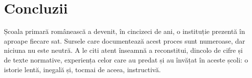 \documentclass{texign-article}
\begin{document}
\section{Concluzii}

Școala primară românească a devenit, în cincizeci de ani, o instituție prezentă în aproape fiecare sat. Sursele care documentează acest proces sunt numeroase, dar niciuna nu este neutră. A le citi atent înseamnă a reconstitui, dincolo de cifre și de texte normative, experiența celor care au predat și au învățat în aceste școli: o istorie lentă, inegală și, tocmai de aceea, instructivă.

\printsources
\printterms
\printabbreviations
\listoffigures
\listoftables
\end{document}
